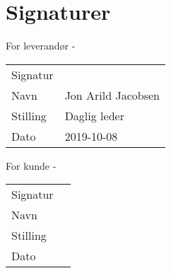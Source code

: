 \section{Signaturer}





\begin{center}
For leverandør - \suppliername
\vspace{1cm}

\begin{tabu} to 0.95\textwidth {  X[l]  X[l]  }

 Signatur &   \\ 
 Navn & Jon Arild Jacobsen  \\ 
 Stilling & Daglig leder  \\ 
 Dato & 2019-10-08  \\ 

\end{tabu}
\end{center}

\vspace{2cm}


\begin{center}
For kunde - \customername	
\vspace{1cm}

 \begin{tabu} to 0.95\textwidth {  X[l]  X[l]  }
 Signatur &   \\ 
 Navn & \hline  \\ 
 Stilling & \hline  \\ 
 Dato & \hline  \\ 
 \end{tabu}

\end{center}